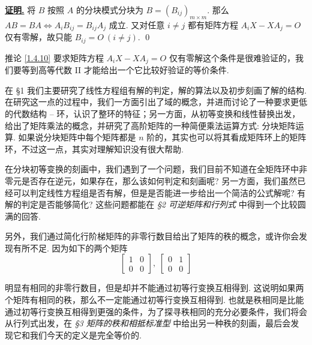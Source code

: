 \documentclass[10pt,openany]{article}
\theoremstyle{thmstyle} %
\theoremstyle{defstyle} %
\theoremstyle{prostyle} %
\theoremstyle{exastyle}
\theoremstyle{remstyle}
\renewenvironment{proof}[1][证明]{\par\underline{\textbf{#1.}} \;\fangsong}{\qed\par}
\begin{document}
\begin{proof}
	将 \( B \) 按照 \( A \) 的分块模式分块为 \( B=(B_{ij})_{m \times m} \). 那么 \( AB=BA \Leftrightarrow A_iB_{ij}=B_{ij}A_j  \) 成立. 又对任意 \( i \neq j \) 都有矩阵方程 \( A_iX-XA_j=O \) 仅有零解，故只能 \( B_{ij}=O \ (i \neq j) \).
\end{proof}



推论 \ref{1.4.10} 要求矩阵方程 \( A_iX-XA_j=O \) 仅有零解这个条件是很难验证的，我们要等到高等代数 II 才能给出一个它比较好验证的等价条件.

在 \S 1 我们主要研究了线性方程组有解的判定，解的算法以及初步刻画了解的结构. 在研究这一点的过程中，我们一方面引出了域的概念，并进而讨论了一种要求更低的代数结构 -- 环，认识了整环的特征；另一方面，从初等变换和线性替换出发，给出了矩阵乘法的概念，并研究了高阶矩阵的一种简便乘法运算方式: 分块矩阵运算. 如果说分块矩阵中每个矩阵都是 \( n \) 阶的，其实也可以将其看成矩阵环上的矩阵环，不过这一点，其实对理解知识没有很大帮助.

在分块初等变换的刻画中，我们遇到了一个问题，我们目前不知道在全矩阵环中非零元是否存在逆元，如果存在，那么该如何判定和刻画呢? 另一方面，我们虽然已经可以判定线性方程组是否有解，但是是否能进一步给出一个简洁的公式解呢? 有解的判定是否能够简化? 这些问题都能在 \textit{\S 2 可逆矩阵和行列式} 中得到一个比较圆满的回答. 

另外，我们通过简化行阶梯矩阵的非零行数目给出了矩阵的秩的概念，或许你会发现有所不足. 因为如下的两个矩阵
\[ \begin{bmatrix}
	1 & 0 \\ 0 & 0
\end{bmatrix}, \; \begin{bmatrix}
0 & 1 \\ 0 & 0
\end{bmatrix} \]

明显有相同的非零行数目，但是却并不能通过初等行变换互相得到. 这说明如果两个矩阵有相同的秩，那么不一定能通过初等行变换互相得到. 也就是秩相同是比能通过初等行变换互相得到更强的条件，为了探寻秩相同的充分必要条件，我们将会从行列式出发，在 \textit{\S 3 矩阵的秩和相抵标准型} 中给出另一种秩的刻画，最后会发现它和我们今天的定义是完全等价的. 
\end{document}
